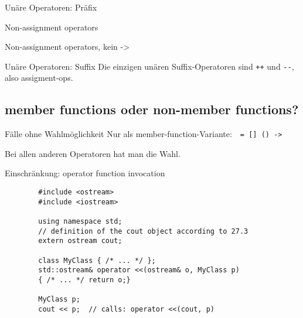 \begin{frame}{Unäre Operatoren: Präfix}
	\onslide*<+>
	{
		Non-assignment operators
		
		\begin{block}{}
			
		\end{block}
	}
	
	\onslide*<+>
	{
		Non-assignment operators, kein -\textgreater
		
		\begin{block}{}
			
		\end{block}
	}
\end{frame}

\begin{frame}[fragile]{Unäre Operatoren: Suffix}
	Die einzigen unären Suffix-Operatoren sind \verb!++! und \verb!--!, also assigment-ops.
	
	\onslide*<+>
	{
		\begin{block}{}
			
		\end{block}
	}
	
	\onslide*<+>
	{
		\begin{block}{}
			
		\end{block}
	}
\end{frame}




\subsection{member functions oder non-member functions?}

\begin{frame}[fragile]{Fälle ohne Wahlmöglichkeit}
	Nur als member-function-Variante:~~\verb!= [] () ->!
	
	\vspace{1em}
	\pause
	
	Bei allen anderen Operatoren hat man die Wahl.
	
	Einschränkung: operator function invocation
	\begin{lstlisting}
		#include <ostream>
		#include <iostream>
		
		using namespace std;
		// definition of the cout object according to 27.3
		extern ostream cout;
		
		class MyClass { /* ... */ };
		std::ostream& operator <<(ostream& o, MyClass p)
		{ /* ... */ return o;}
		
		MyClass p;
		cout << p;	// calls: operator <<(cout, p)
	\end{lstlisting}
\end{frame}

